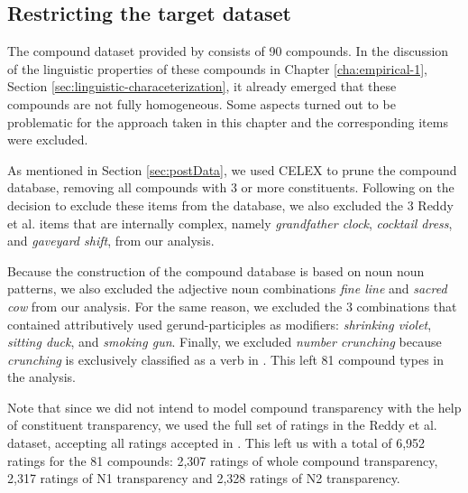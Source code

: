 \subsection{Restricting the target dataset}
\label{sec:restricted-target}

The compound dataset provided by \citet{Reddyetal:2011} consists of 90
compounds. In the discussion of the linguistic properties of these
compounds in Chapter \ref{cha:empirical-1}, Section \ref{sec:linguistic-characeterization}, it
already emerged that these compounds are not fully
homogeneous. Some aspects turned out to be problematic for the
approach taken in this chapter and the corresponding items were
 excluded.

As mentioned in Section \ref{sec:postData}, we used CELEX to prune the compound
data\-base, removing all compounds with 3 or more constituents. Following on the decision to exclude these items from the
database, we also excluded the 3 Reddy et al. items that are
internally complex, namely \emph{grandfather clock}, \emph{cocktail dress}, and \emph{gaveyard shift}, from our analysis.
 

Because the construction of the compound database is based on noun
noun patterns, we also excluded the adjective noun combinations \emph{fine line} and
\emph{sacred cow} from our analysis. For the same reason, we excluded the
3 combinations that contained attributively used gerund-participles as modifiers:
\emph{shrinking violet}, \emph{sitting duck}, and \emph{smoking
  gun}. Finally, we excluded \emph{number crunching} because
\emph{crunching} is exclusively classified as a verb in . This
left 81 compound types in the analysis. 

\enlargethispage{1\baselineskip}
Note that since we did not intend to model compound transparency with
the help of constituent transparency, we used the full set of ratings
in the Reddy et al. dataset, accepting all ratings accepted in
\citet{Reddyetal:2011}. This left us with a total of 6,952 ratings for
the 81 compounds: 2,307 ratings of whole compound transparency, 2,317
ratings of N1 transparency and 2,328 ratings of N2 transparency. 

